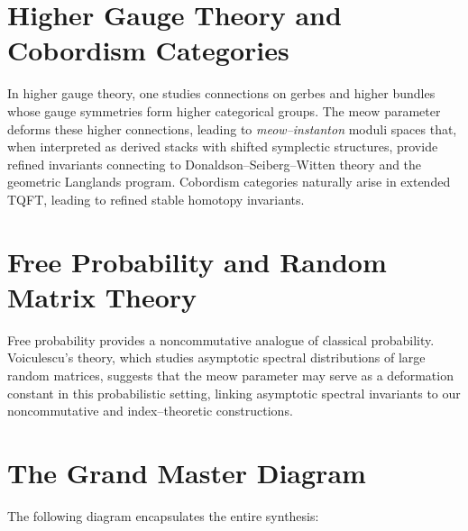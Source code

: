 \documentclass[11pt,a4paper]{article}
\newcommand{\meow}{\mathrm{meow}}
\newcommand{\Mmeow}{\mathcal{M}_{\meow}}
\newcommand{\Ameow}{\mathcal{A}_{\meow}}
\newcommand{\Hmeow}{\mathcal{H}_{\meow}}
\newcommand{\Dmeow}{\mathcal{D}_{\meow}}
\newcommand{\Cmeow}{\mathcal{C}_{\meow}}
\newcommand{\ind}{\operatorname{ind}}
\newcommand{\TMF}{\operatorname{TMF}}
\theoremstyle{plain}
\theoremstyle{definition}
\theoremstyle{remark}
\begin{document}
\section{Higher Gauge Theory and Cobordism Categories}
In higher gauge theory, one studies connections on gerbes and higher bundles whose gauge symmetries form higher categorical groups. The \(\meow\) parameter deforms these higher connections, leading to \emph{meow--instanton} moduli spaces that, when interpreted as derived stacks with shifted symplectic structures, provide refined invariants connecting to Donaldson--Seiberg--Witten theory and the geometric Langlands program. Cobordism categories naturally arise in extended TQFT, leading to refined stable homotopy invariants.

\section{Free Probability and Random Matrix Theory}
Free probability provides a noncommutative analogue of classical probability. Voiculescu’s theory, which studies asymptotic spectral distributions of large random matrices, suggests that the \(\meow\) parameter may serve as a deformation constant in this probabilistic setting, linking asymptotic spectral invariants to our noncommutative and index–theoretic constructions.

\section{The Grand Master Diagram}
The following diagram encapsulates the entire synthesis:
\begin{center}
\end{center}
\end{document}
